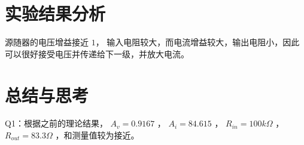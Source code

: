 \documentclass[lang=cn,11pt,a4paper,cite=authoryear]{elegantpaper}
\begin{document}
\section{实验结果分析}

源随器的电压增益接近 \(1\)， 输入电阻较大，而电流增益较大，输出电阻小，因此可以很好接受电压并传递给下一级，并放大电流。

\section{总结与思考}

Q1：根据之前的理论结果， \(A_v = 0.9167\) ， \(A_i = 84.615\) ， \(R_{in} = 100 k \Omega\) ， \(R_{out} = 83.3 \Omega\) ，和测量值较为接近。


\end{document}
